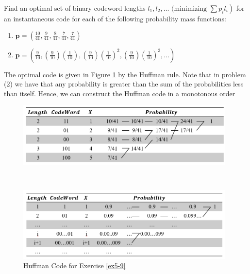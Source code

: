 \begin{exercise}{ Find an optimal set of binary codeword lengths $\left.l_{1}, l_{2}, \ldots \text { (minimizing } \sum p_{i} l_{i}\right)$ for an instantaneous code for each of the following probability mass functions:
  \begin{enumerate}
    \item $\mathbf{p}=\left(\frac{10}{41}, \frac{9}{41}, \frac{8}{41}, \frac{7}{41}, \frac{7}{41}\right)$
    \item $\mathbf{p}=\left(\frac{9}{10},\left(\frac{9}{10}\right)\left(\frac{1}{10}\right),\left(\frac{9}{10}\right)\left(\frac{1}{10}\right)^{2},\left(\frac{9}{10}\right)\left(\frac{1}{10}\right)^{3}, \ldots\right)$
  \end{enumerate}
  }
  \begin{solution} The optimal code is given in Figure \ref{fig:ex9} by the Huffman rule. Note that in problem (2) we have that any probability is greater than the sum of the probabilities less than itself. Hence, we can construct the Huffman code in a monotonous order
  \end{solution}
  \label{ex5-9}
\end{exercise}

\begin{figure}[htbp]
  \centering
  \caption{Huffman Code for Exercise \ref{ex5-9}}
      \begin{minipage}[t]{0.95\linewidth}
          \centering
          \includegraphics[width=11cm]{img/5-5.png}
      \end{minipage}
      \par{~}
      \begin{minipage}[t]{0.95\linewidth}
          \centering
          \includegraphics[width=11cm]{img/5-6.png}
      \end{minipage}
    \label{fig:ex9}
\end{figure}

